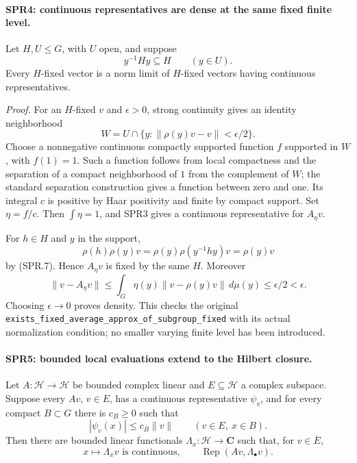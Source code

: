 \paragraph{SPR4: continuous representatives are dense at the same fixed finite level.}
\label{claim:SPR4}
Let \(H,U\le G\), with \(U\) open, and suppose
\[
          y^{-1}Hy\subseteq H\qquad(y\in U).
 \tag{SPR.7}
\]
Every \(H\)-fixed vector is a norm limit of \(H\)-fixed vectors
having continuous representatives.

\emph{Proof.}
For an \(H\)-fixed \(v\) and \(\epsilon>0\), strong continuity gives
an identity neighborhood
\[
 W=U\cap\{y:\|\rho(y)v-v\|<\epsilon/2\}.
\]
Choose a nonnegative continuous compactly supported function
\(f\) supported in \(W\), with \(f(1)=1\).
Such a function follows from local compactness and the separation
of a compact neighborhood of \(1\) from the complement of \(W\);
the standard separation construction gives a function between
zero and one.  Its integral \(c\) is positive by Haar positivity
and finite by compact support.
Set \(\eta=f/c\).  Then \(\int\eta=1\), and SPR3 gives a
continuous representative for \(A_\eta v\).

For \(h\in H\) and \(y\) in the support,
\[
 \rho(h)\rho(y)v
 =\rho(y)\rho(y^{-1}hy)v=\rho(y)v
\]
by (SPR.7).  Hence \(A_\eta v\) is fixed by the same \(H\).
Moreover
\[
 \|v-A_\eta v\|
 \le\int_G\eta(y)\|v-\rho(y)v\|\,d\mu(y)
 \le\epsilon/2<\epsilon.
\]
Choosing \(\epsilon\to0\) proves density.
This checks the original
\texttt{exists\_\allowbreak fixed\_\allowbreak average\_\allowbreak approx\_\allowbreak of\_\allowbreak subgroup\_\allowbreak fixed}
with its actual normalization condition; no smaller varying
finite level has been introduced.

\paragraph{SPR5: bounded local evaluations extend to the Hilbert closure.}
\label{claim:SPR5}
Let \(A:\mathcal H\to\mathcal H\) be bounded complex linear and
\(E\subseteq\mathcal H\) a complex subspace.
Suppose every \(Av\), \(v\in E\), has a continuous representative
\(\psi_v\), and for every compact \(B\subset G\) there is \(c_B\ge0\)
such that
\[
           |\psi_v(x)|\le c_B\|v\|
             \qquad(v\in E,\ x\in B).
 \tag{SPR.8}
\]
Then there are bounded linear functionals
\(\Lambda_x:\mathcal H\to\mathbf C\) such that, for \(v\in\overline E\),
\[
 x\longmapsto\Lambda_xv\text{ is continuous},\qquad
             \operatorname{Rep}(Av,\Lambda_\bullet v).
 \tag{SPR.9}
\]


